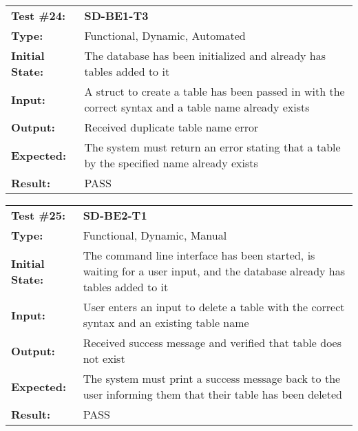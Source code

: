 \documentclass[12pt, titlepage]{article}
\begin{document}
\begin{mdframed}[linewidth=1pt]
\begin{tabularx}{\textwidth}{@{}p{3cm}X@{}}
{\bf Test \#24:} & {\bf SD-BE1-T3}\\[\baselineskip]
{\bf Type:} & Functional, Dynamic, Automated \\[0.5\baselineskip]
{\bf Initial State:} & The database has been initialized and already has tables added to it \\[\baselineskip]
{\bf Input:} & A struct to create a table has been passed in with the correct syntax and a table name already exists \\[\baselineskip]
{\bf Output:} & Received duplicate table name error \\[\baselineskip]
{\bf Expected:} & The system must return an error stating that a table by the specified name already exists \\[\baselineskip]
{\bf Result:} & PASS
\end{tabularx}
\end{mdframed}

\begin{mdframed}[linewidth=1pt]
\begin{tabularx}{\textwidth}{@{}p{3cm}X@{}}
{\bf Test \#25:} & {\bf SD-BE2-T1}\\[\baselineskip]
{\bf Type:} & Functional, Dynamic, Manual \\[0.5\baselineskip]
{\bf Initial State:} & The command line interface has been started, is waiting for a user input, and the database already has tables added to it \\[\baselineskip]
{\bf Input:} & User enters an input to delete a table with the correct syntax and an existing table name \\[\baselineskip]
{\bf Output:} & Received success message and verified that table does not exist \\[\baselineskip]
{\bf Expected:} & The system must print a success message back to the user informing them that their table has been deleted \\[\baselineskip]
{\bf Result:} & PASS
\end{tabularx}
\end{mdframed}
\end{document}

